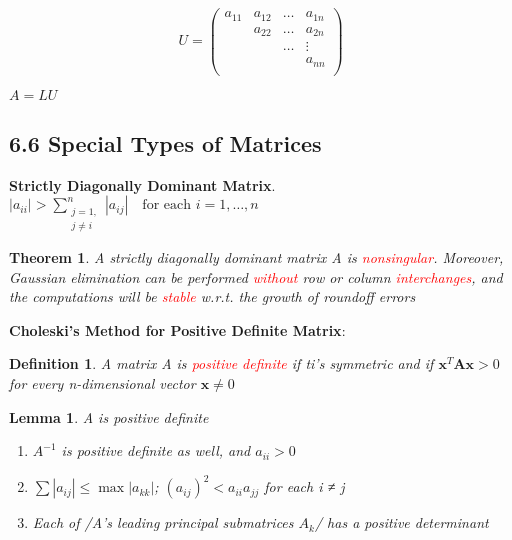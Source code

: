\documentclass[11pt]{article}
\newtheorem{theorem}{Theorem}[section]
\newtheorem{definition}{Definition}[section]
\newtheorem{lemma}{Lemma}[section]
\begin{document}
\begin{equation*}
U=
\begin{pmatrix}
a_{11}&a_{12}&\dots&a_{1n}\\
&a_{22}&\dots&a_{2n}\\
&&\dots&\vdots\\
&&&a_{nn}\\
\end{pmatrix}
\end{equation*}

\(A=LU\)
\subsection{6.6 Special Types of Matrices}
\label{sec:orgea19073}
\textbf{Strictly Diagonally Dominant Matrix}.
\(|a_{ii}|>\displaystyle\sum_{\substack{j=1,\\j\neq i}}^n|a_{ij}| \quad
   \text{for each } i=1,\dots,n\)

\begin{theorem}
A strictly diagonally dominant matrix A is \textcolor{red}{nonsingular}. Moreover,
Gaussian elimination can be performed \textcolor{red}{without} row or column
\textcolor{red}{interchanges}, and the computations will be \textcolor{red}{stable}
w.r.t. the growth of roundoff errors
\end{theorem}

\textbf{Choleski's Method for Positive Definite Matrix}:
\begin{definition}
A matrix A is \textcolor{red}{positive definite} if ti's symmetric and if    
$ \mathbf{x}^T \mathbf{A} \mathbf{x}>0$ for every n-dimensional vector $ \mathbf{x}\neq 0$
\end{definition}

\begin{lemma}
A is positive definite
\begin{enumerate}
\item $A^{-1}$ is positive definite as well, and $a_{ii}>0$
\item $\sum|a_{ij}|\le\max|a_{kk}|$; $(a_{ij})^2<a_{ii}a_{jj}$ for each i ≠ j
\item Each of /A's leading principal submatrices $A_k$/ has a positive determinant
\end{enumerate}
\end{lemma}
\end{document}
